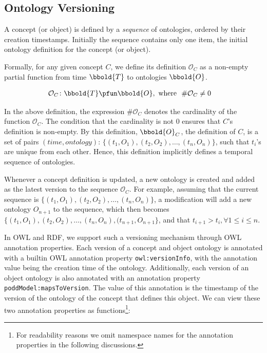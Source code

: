 \documentclass[preprint,12pt]{elsarticle}
\begin{document}
\subsection{Ontology Versioning}\label{sec:versioning}
A concept (or object) is defined by a \emph{sequence} of ontologies, ordered by their creation timestamps. Initially the sequence contains only one item, the initial ontology definition for the concept (or object).

Formally, for any given concept $C$, we define its definition $\mathcal{O}_C$ as a non-empty partial function from time $\bbold{T}$ to ontologies $\bbold{O}$.

\begin{align}
\mathcal{O}_C &\colon \bbold{T} \pfun \bbold{O} \mathrm{,~where~~} \#\mathcal{O}_C \neq 0\label{eqn:version}
\end{align}
 
In the above definition, the expression $\#\mathcal{O}_C$ denotes the cardinality of the function $\mathcal{O}_C$. The condition that the cardinality is not 0 ensures that $C$'s definition is non-empty. By this definition, $\bbold{O}_C$, the definition of $C$, is a set of pairs $(time, ontology)$: $\{(t_1, O_1),(t_2,O_2),\ldots,(t_n,O_n)\}$, such that $t_i$'s are unique from each other. Hence, this definition implicitly defines a temporal sequence of ontologies. 

Whenever a concept definition is updated, a new ontology is created and added as the latest version to the sequence $\mathcal{O}_C$. For example, assuming that the current sequence is $\{(t_1, O_1),(t_2,O_2),\ldots,(t_n,O_n)\}$, a modification will add a new ontology $O_{n+1}$ to the sequence, which then becomes $\{(t_1, O_1),(t_2,O_2),\ldots,(t_n,O_n), (t_{n+1},O_{n+1}\}$, and that $t_{i+1} > t_i, \forall 1\leq i\leq n$.

In OWL and RDF, we support such a versioning mechanism through OWL annotation properties. Each version of a concept and object ontology is annotated with a builtin OWL annotation property \texttt{owl:versionInfo}, with the annotation value being the creation time of the ontology. Additionally, each version of an object ontology is also annotated with an annotation property \texttt{poddModel:mapsToVersion}. The value of this annotation is the timestamp of the version of the ontology of the concept that defines this object. We can view these two annotation properties as functions\footnote{For readability reasons we omit namespace names for the annotation properties in the following discussions.}:
\end{document}
